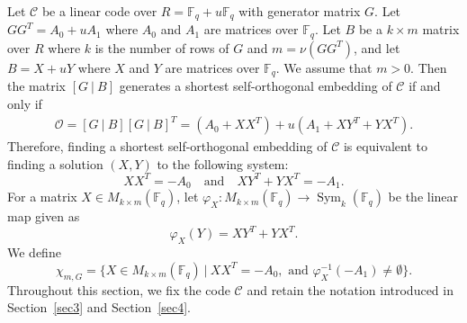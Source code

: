 \documentclass{article}
\theoremstyle{definition}
\theoremstyle{remark}
\begin{document}
Let $\mathcal{C}$ be a linear code over $R=\mathbb{F}_q+u\mathbb{F}_q$ with generator matrix $G$. Let $GG^T=A_0+uA_1$ where $A_0$ and $A_1$ are matrices over $\mathbb{F}_q$. Let $B$ be a $k\times m$ matrix over $R$ where $k$ is the number of rows of $G$ and $m=\nu(GG^T)$, and let $B=X+uY$ where $X$ and $Y$ are matrices over $\mathbb{F}_q$. We assume that $m>0$. Then the matrix $[G~|~B]$ generates a shortest self-orthogonal embedding of $\mathcal{C}$ if and only if
\begin{align*}
    \mathcal{O}=[G~|~B][G~|~B]^T=(A_0+XX^T)+u(A_1+XY^T+YX^T).
\end{align*}
Therefore, finding a shortest self-orthogonal embedding of $\mathcal{C}$ is equivalent to finding a solution $(X,Y)$ to the following system:
\[
XX^T=-A_0\quad\mbox{and}\quad XY^T+YX^T=-A_1.
\]
For a matrix $X\in M_{k\times m}(\mathbb{F}_q)$, let $\varphi_X:M_{k\times m}(\mathbb{F}_q)\to \operatorname{Sym}_k(\mathbb{F}_q)$ be the linear map given as 
\[
\varphi_X(Y)=XY^T+YX^T.
\]
We define
\[
\chi_{m, G}=\{X\in M_{k\times m}(\mathbb{F}_q)~|~XX^T=-A_0, \mbox{ and }\varphi_X^{-1}(-A_1)\ne \emptyset\}.
\]
Throughout this section, we fix the code $\mathcal{C}$ and retain the notation introduced in Section~\ref{sec3} and Section~\ref{sec4}.
\end{document}
